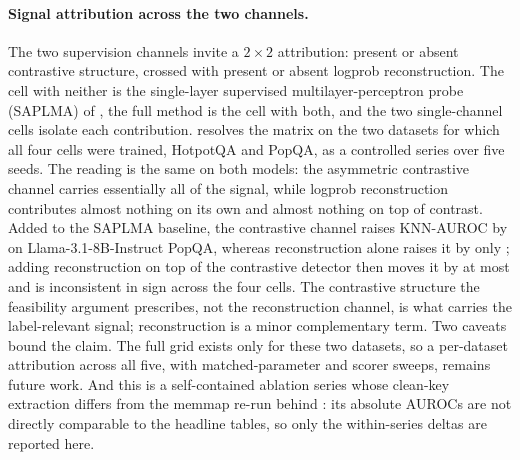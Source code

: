 \paragraph{Signal attribution across the two channels.}
The two supervision channels invite a $2\times 2$ attribution: present or absent
contrastive structure, crossed with present or absent logprob reconstruction. The
cell with neither is the single-layer supervised multilayer-perceptron probe
(SAPLMA) of , the full method is the cell with both, and the two
single-channel cells isolate each contribution.  resolves the
matrix on the two datasets for which all four cells were trained, HotpotQA and
PopQA, as a controlled series over five seeds. The reading is the same on both
models: the asymmetric contrastive channel carries essentially all of the signal,
while logprob reconstruction contributes almost nothing on its own and almost
nothing on top of contrast. Added to the SAPLMA baseline, the contrastive channel
raises KNN-AUROC by
on Llama-3.1-8B-Instruct PopQA, whereas reconstruction alone raises it by only
;
adding reconstruction on top of the contrastive detector then moves it by
at most and is inconsistent in sign across the four cells. The contrastive
structure the feasibility argument prescribes, not the reconstruction channel, is
what carries the label-relevant signal; reconstruction is a minor complementary
term. Two caveats bound the claim. The full grid exists only for these two
datasets, so a per-dataset attribution across all five, with matched-parameter and
scorer sweeps, remains future work. And this is a self-contained ablation series
whose clean-key extraction differs from the memmap re-run behind
: its absolute AUROCs are not
directly comparable to the headline tables, so only the within-series deltas are
reported here.

